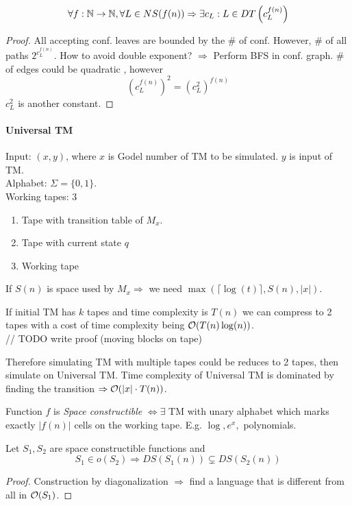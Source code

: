 \begin{theorem}
	\[\forall f:\operatorname{\mathbb{N}} \to \operatorname{\mathbb{N}}, \forall L \in NS(f(n)) \Rightarrow \exists c_L: L \in DT\left(c_L^{f(n)}\right) \]
\end{theorem}
\begin{proof}
	All accepting conf. leaves are bounded by the \# of conf. However, \# of all paths $2^{c_L^{f(n)}}$.
	How to avoid double exponent? $\Rightarrow$ Perform BFS in conf. graph.
	\# of edges could be quadratic , however
	\[ \left(c_L^{f(n)}\right)^2 = \left(c_L^2\right)^{f(n)} \]
	$c_L^2$ is another constant.
\end{proof}

\paragraph{Universal TM}
Input: $(x,y)$, where $x$ is Godel number of TM to be simulated. $y$ is input of TM.\\
Alphabet: $\Sigma = \{ 0, 1 \} $.\\
Working tapes: 3\\
\begin{enumerate}
	\item Tape with transition table of $M_x$.
	\item Tape with current state $q$
	\item Working tape
\end{enumerate}
If $S(n)$ is space used by $M_x \Rightarrow$ we need $\max(\lceil \log(t) \rceil, S(n), |x|)$.

\begin{observation}
	If initial TM has $k$ tapes and time complexity is $T(n)$ we can compress to 2 tapes with a cost of time complexity being $\mathcal{O}(T(n) \log(n))$. \\
	// TODO write proof (moving blocks on tape)

	Therefore simulating TM with multiple tapes could be reduces to 2 tapes, then simulate on Universal TM.
	Time complexity of Universal TM is dominated by finding the transition $\Rightarrow \mathcal{O}(|x| \cdot T(n))$.
\end{observation}

\begin{definition}
	Function $f$ is \emph{Space constructible} $\iff \exists$ TM with unary alphabet which marks exactly $|f(n)|$ cells on the working tape. E.g. $\log, e^x,$ polynomials.
\end{definition}

\begin{theorem}\label{s_hier}
	Let $S_1, S_2$ are space constructible functions and
	\[ S_1 \in o(S_2) \Rightarrow DS(S_1(n)) \subsetneq DS(S_2(n)) \]
\end{theorem}
\begin{proof}
	Construction by diagonalization $\Rightarrow$ find a language that is different from all in $\mathcal{O}(S_1)$.
\end{proof}

